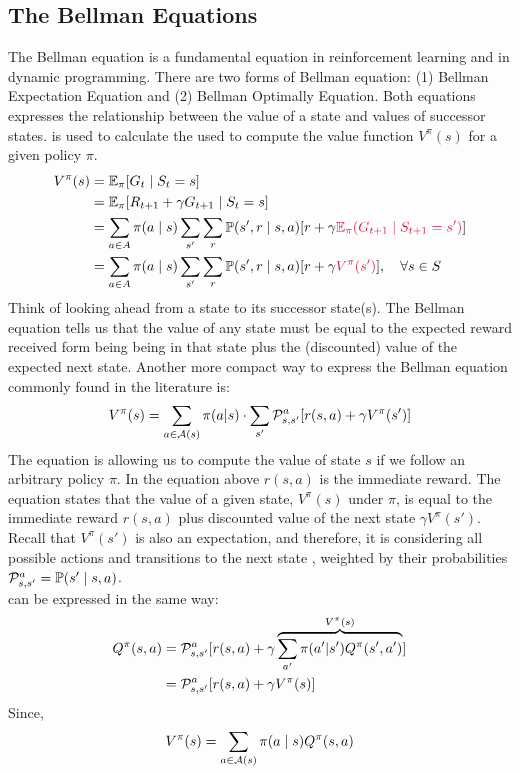 \subsection{The Bellman Equations}
The Bellman equation is a fundamental equation in reinforcement learning and in dynamic programming\cite{bellman1958}. There are two forms of Bellman equation: (1) Bellman Expectation Equation and (2) Bellman Optimally Equation. 
Both equations expresses the relationship between the value of a state and values of successor states. 
 is used to calculate the used to compute the value function $V^\pi(s)$ for a given policy $\pi$.
\begin{align*}
    V^{\pi}(s) &= \EE_{\pi}[G_t \mid S_t =s] \\
    &= \EE_{\pi}[R_{t+1} + \gamma G_{t+1} \mid S_t =s] \\
    &= \sum_{a \in A} \pi(a\mid s) \sum_{s'} \sum_{r} \PP(s',r \mid s,a) [r + \gamma \term{$\EE_{\pi} (G_{t+1} \mid S_{t+1} = s')$} ] \\
    &=\sum_{a \in A} \pi(a\mid s) \sum_{s'} \sum_{r} \PP(s',r \mid s,a) [r + \gamma \term{$V^{\pi}(s')$} ], \quad \forall s \in S
\end{align*}
Think of looking ahead from a state to its successor state(s). 
The Bellman equation tells us that the value of any state must be equal to the expected reward received form being being in that state plus the (discounted) value of the expected next state.
Another more compact way to express the Bellman equation commonly found in the literature is: 
\begin{equation}
    V^{\pi}(s) = \sum_{a \in \mathcal A(s)} \pi(a|s) \cdot \sum_{s'} \mathcal P_{s,s'}^{a} [r(s,a) + \gamma V^{\pi}(s')]
\end{equation}
The equation is allowing us to compute the value of state $s$ if we follow an arbitrary policy  $\pi$. In the equation above $r(s,a)$ is the immediate reward. 
The equation states that the value of a given state, $V^{\pi}(s)$ under $\pi$, is equal to the immediate reward $r(s,a)$ plus discounted value of the next state $\gamma V^{\pi}(s')$. Recall that $V^{\pi}(s')$ is also an expectation, and therefore, it is considering all possible actions and transitions to the next state , weighted by their probabilities $\mathcal P_{s,s'}^{a} = \mathbb P(s' \mid s,a)$.
\\
 can be expressed in the same way:
\begin{align}
    Q^{\pi}(s,a) &= \mathcal P_{s,s'}^{a} [ r(s,a) + \gamma \overbrace{\sum_{a'} \pi(a'|s') Q^{\pi}(s',a')}^{V^{\pi}(s)}] \\
    &= \mathcal P_{s,s'}^{a} [ r(s,a) + \gamma V^{\pi}(s)]
\end{align}
Since, 
$$
V^{\pi}(s) = \sum_{a \in \mathcal A(s)} \pi(a \mid s) Q^{\pi}(s,a)
$$
